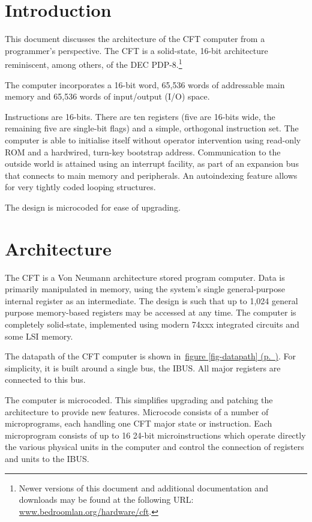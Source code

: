 \documentclass[11pt,a4paper,twocolumns]{article}
\newcommand{\cf}[2][section]{\hyperref[#2]{#1 \ref*{#2} (p.~\pageref*{#2})}}
\newcommand{\fcf}[1]{\cf[figure]{#1}}
\newcommand\link[1]{\sf\href{http://#1}{#1}}
\newcommand\bus[1]{{#1}}
\newcommand\IBUS{\bus{IBUS}}
\begin{document}
\section{Introduction}

  This document discusses the architecture of the CFT computer from a
  programmer's perspective. The CFT is a solid-state, 16-bit
  architecture reminiscent, among others, of the DEC
  PDP-8.\footnote{Newer versions of this document and additional
    documentation and downloads may be found at the following URL:\\
    \link{www.bedroomlan.org/hardware/cft}.}

  The computer incorporates a 16-bit word, 65,536 words of addressable
  main memory and 65,536 words of input/output (I/O) space.

  Instructions are 16-bits. There are ten registers (five are 16-bits
  wide, the remaining five are single-bit flags) and a simple,
  orthogonal instruction set. The computer is able to initialise
  itself without operator intervention using read-only ROM and a
  hardwired, turn-key bootstrap address. Communication to the outside
  world is attained using an interrupt facility, as part of an
  expansion bus that connects to main memory and peripherals. An
  autoindexing feature allows for very tightly coded looping
  structures.

  The design is microcoded for ease of upgrading.

\section{Architecture}

The CFT is a Von Neumann architecture stored program computer. Data is
primarily manipulated in memory, using the system's single
general-purpose internal register as an intermediate. The design is
such that up to 1,024 general purpose memory-based registers may be
accessed at any time. The computer is completely solid-state,
implemented using modern 74xxx integrated circuits and some LSI
memory.

The datapath of the CFT computer is shown in~\fcf{fig-datapath}. For
simplicity, it is built around a single bus, the \IBUS. All major
registers are connected to this bus.

The computer is microcoded. This simplifies upgrading and patching the
architecture to provide new features. Microcode consists of a number
of microprograms, each handling one CFT major state or
instruction. Each microprogram consists of up to 16 24-bit
microinstructions which operate directly the various physical units in
the computer and control the connection of registers and units to the
\IBUS.
\end{document}
